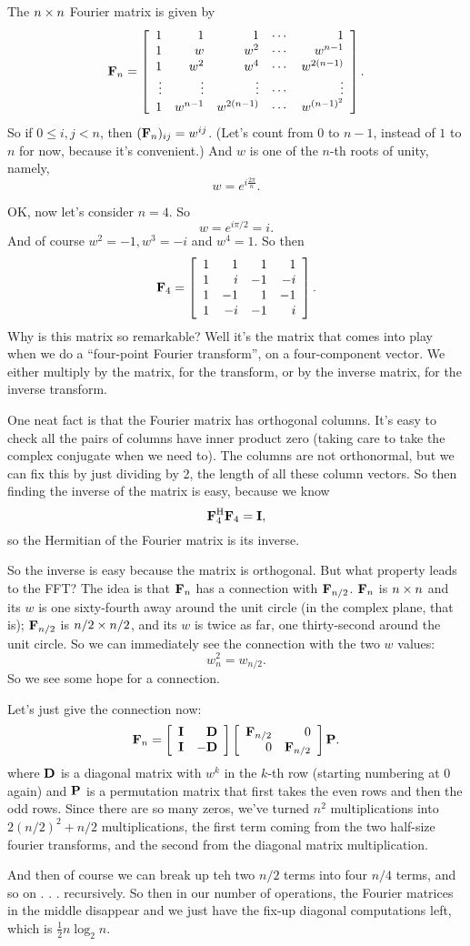 The $n\times n$ Fourier matrix is given by
\[ \boldsymbol{\mathbf{F}}_n = \left[ \begin{array}{rrrrrrrrrrrrrrrrrrrrrrrrr} 1&1&1&\cdots&1\\1&w&w^2&\cdots&w^{n-1}\\1&w^2&w^4&\cdots&w^{2(n-1)}\\\vdots&\vdots&\vdots&\cdots&\vdots\\1&w^{n-1}&w^{2(n-1)}&\cdots&w^{(n-1)^2}\\ \end{array} \right]. \]
So if $0 \le i,j < n$, then $(\boldsymbol{\mathbf{F}}_n)_{ij} = w^{ij}$. (Let's count from 0 to $n-1$, instead of $1$ to $n$ for now, because it's convenient.) And $w$ is one of the $n$-th roots of unity, namely,
\[ w = e^{i\frac{2\pi}n}. \]

OK, now let's consider $n=4$. So 
\[ w = e^{i\pi / 2} = i. \]
And of course $w^2 = -1, w^3 = -i$ and $w^4 = 1$. So then
\[ \boldsymbol{\mathbf{F}}_4 = \left[ \begin{array}{rrrrrrrrrrrrrrrrrrrrrrrrr} 1&1&1&1\\1&i&-1&-i\\1&-1&1&-1\\1&-i&-1&i\\ \end{array} \right]. \]
Why is this matrix so remarkable? Well it's the matrix that comes into play when we do a ``four-point Fourier transform'', on a four-component vector. We either multiply by the matrix, for the transform, or by the inverse matrix, for the inverse transform.

One neat fact is that the Fourier matrix has orthogonal columns. It's easy to check all the pairs of columns have inner product zero (taking care to take the complex conjugate when we need to). The columns are not orthonormal, but we can fix this by just dividing by 2, the length of all these column vectors. So then finding the inverse of the matrix is easy, because we know
\[ \boldsymbol{\mathbf{F}}_4^\mathrm{H}\boldsymbol{\mathbf{F}}_4 = \boldsymbol{\mathbf{I}}, \]
so the Hermitian of the Fourier matrix is its inverse. 

So the inverse is easy because the matrix is orthogonal. But what property leads to the FFT? The idea is that $\boldsymbol{\mathbf{F}}_n$ has a connection with $\boldsymbol{\mathbf{F}}_{n/2}$. $\boldsymbol{\mathbf{F}}_n$ is $n\times n$ and its $w$ is one sixty-fourth away around the unit circle (in the complex plane, that is); $\boldsymbol{\mathbf{F}}_{n/2}$ is $n/2 \times n/2$, and its $w$ is twice as far, one thirty-second around the unit circle. So we can immediately see the connection with the two $w$ values:
\[ w_n^2 = w_{n/2}. \]
So we see some hope for a connection.

Let's just give the connection now:
\[ \boldsymbol{\mathbf{F}}_n = \left[ \begin{array}{rrrrrrrrrrrrrrrrrrrrrrrrr} \boldsymbol{\mathbf{I}}&\boldsymbol{\mathbf{D}}\\\boldsymbol{\mathbf{I}}&-\boldsymbol{\mathbf{D}}\\ \end{array} \right]\left[ \begin{array}{rrrrrrrrrrrrrrrrrrrrrrrrr} \boldsymbol{\mathbf{F}}_{n/2}&0\\0&\boldsymbol{\mathbf{F}}_{n/2}\\ \end{array} \right]\boldsymbol{\mathbf{P}}. \]
where $\boldsymbol{\mathbf{D}}$ is a diagonal matrix with $w^k$ in the $k$-th row (starting numbering at 0 again) and $\boldsymbol{\mathbf{P}}$ is a permutation matrix that first takes the even rows and then the odd rows. Since there are so many zeros, we've turned $n^2$ multiplications into $2(n/2)^2 + n/2$ multiplications, the first term coming from the two half-size fourier transforms, and the second from the diagonal matrix multiplication.

And then of course we can break up teh two $n/2$ terms into four $n/4$ terms, and so on . . . recursively. So then in our number of operations, the Fourier matrices in the middle disappear and we just have the fix-up diagonal computations left, which is $\frac 12 n \log_2 n$.